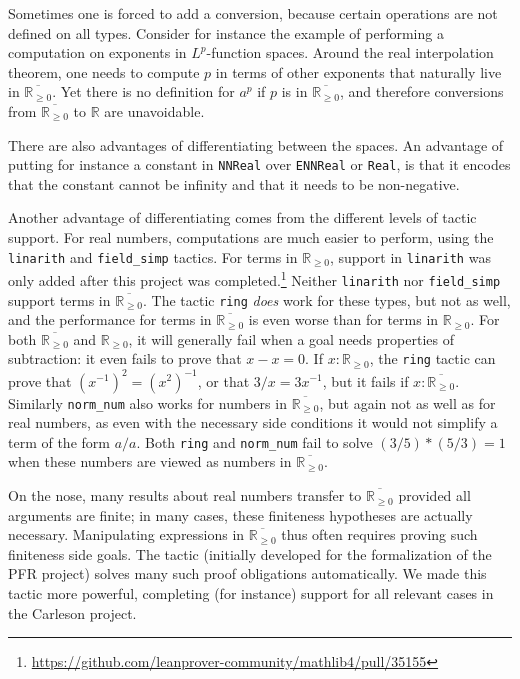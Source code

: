 \documentclass[12pt]{amsart}
\newcommand*{\real}{\mathbb{R}} %
\newcommand{\nnreal}{\real_{\ge0}}
\newcommand{\ennreal}{\overline{\real_{\ge0}}}
\theoremstyle{definition}
\theoremstyle{plain}
\begin{document}
Sometimes one is forced to add a conversion, because certain operations are not defined on all types.
Consider for instance the example of performing a computation on exponents in $L^p$-function spaces.
Around the real interpolation theorem, one needs to compute $p$ in terms of other exponents that
naturally live in $\ennreal$.
Yet there is no definition for $a^p$ if $p$ is in $\ennreal$, and therefore conversions from
$\ennreal$ to $\real$ are unavoidable.

There are also advantages of differentiating between the spaces.
An advantage of putting for instance a constant in \texttt{NNReal} over \texttt{ENNReal} or
\texttt{Real}, is that it encodes that the constant cannot be infinity and that it needs to be non-negative.

Another advantage of differentiating comes from the different levels of tactic support.
For real numbers, computations are much easier to perform, using the \texttt{linarith} and \texttt{field\_simp} tactics.
For terms in $\nnreal$, support in \texttt{linarith} was only added after this project was completed.\footnote{\url{https://github.com/leanprover-community/mathlib4/pull/35155}}
Neither \texttt{linarith} nor \texttt{field\_simp} support terms in $\ennreal$.
The tactic \texttt{ring} \emph{does} work for these types, but not as well, and the performance for terms in $\ennreal$ is even worse than for terms in $\nnreal$.
For both $\ennreal$ and $\nnreal$, it will generally fail when a goal needs properties of subtraction: it even fails to prove that $x - x = 0$. If $x : \nnreal$, the \texttt{ring} tactic can prove that $(x^{-1})^2 = (x ^ 2)^{-1}$, or that $3 / x = 3 x^{-1}$, but it fails if $x : \ennreal$.
Similarly \texttt{norm\_num} also works for numbers in $\ennreal$, but again not as well as for real numbers,
as even with the necessary side conditions it would not simplify a term of the form $a / a$. Both \texttt{ring} and \texttt{norm\_num} fail to solve $(3/5) * (5/3) = 1$ when these numbers are viewed as numbers in $\ennreal$.

On the nose, many results about real numbers transfer to $\ennreal$ provided all arguments are finite; in many cases, these finiteness hypotheses are actually necessary. Manipulating expressions in $\ennreal$ thus often requires proving such finiteness side goals. The  tactic (initially developed for the formalization of the PFR project) solves many such proof obligations automatically. We made this tactic more powerful, completing (for instance) support for all relevant cases in the Carleson project.
\end{document}
